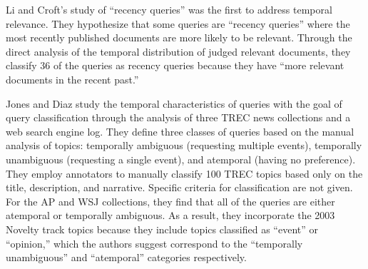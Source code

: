 \documentclass[runningheads,a4paper]{llncs}
\begin{document}
\begin{table}
\caption{TREC topics and collections used in temporal retrieval studies}
\label{table.topics}
\end{table}

Li and Croft's study of ``recency queries''  \cite{Li2003} was the first to address temporal relevance. They hypothesize that some queries are ``recency queries'' where the most recently published documents are more likely to be relevant.  Through the direct analysis of the temporal distribution of judged relevant documents, they classify 36 of the queries as recency queries because they have ``more relevant documents in the recent past.''

Jones and Diaz \cite{Jones2007} study the temporal characteristics of queries with the goal of query classification through the analysis of three TREC news collections and a web search engine log. They define three classes of queries based on the manual analysis of topics: temporally ambiguous (requesting multiple events),  temporally unambiguous (requesting a single event), and atemporal (having no preference). They employ annotators to  manually classify 100 TREC topics based only on the title, description, and narrative. Specific criteria for classification are not given. For the AP and WSJ collections, they find that all of the queries are either atemporal or temporally ambiguous. As a result, they incorporate the 2003 Novelty track topics because they include topics classified as ``event'' or ``opinion,'' which the authors suggest correspond to the ``temporally unambiguous'' and ``atemporal'' categories respectively.
\end{document}
